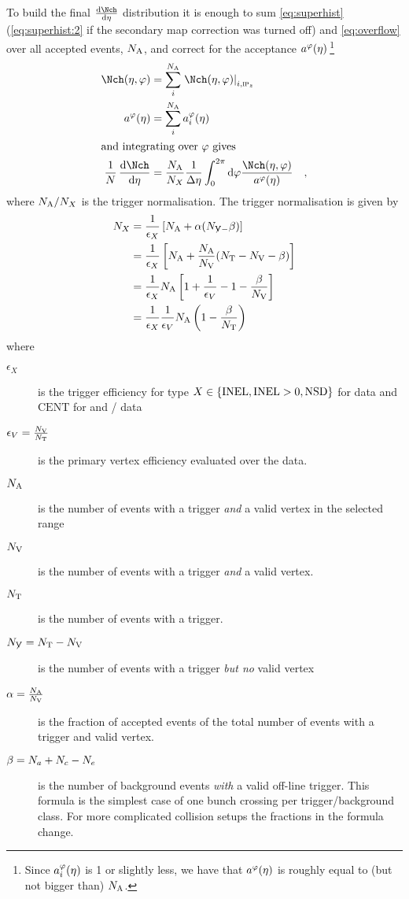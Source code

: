 To build the final $\dndeta$ distribution it is enough to sum
\eqref{eq:superhist} (\eqref{eq:superhist:2} if the secondary map
correction was turned off) and \eqref{eq:overflow} over all accepted
events, ${N_{\text{A}}}$, and correct for the acceptance
$a^{\varphi}(\eta){}\,$\footnote{Since $a_i^{\varphi}(\eta)$ is 1 or slightly less, we have
  that $a^{\varphi}(\eta)$ is roughly equal to (but not bigger than) ${N_{\text{A}}}$.}
\begin{align}
  \dndetadphi &= \sum_i^{\NA}\dndetadphi[i,\subIPz]\\ 
  \PhiAcc &= \sum_i^{\NA}\phiAcc\\
\intertext{and integrating over $\varphi$ gives}
  \ndndeta &=
  \frac{\NA}{\N{X}{}} \frac1{\Delta\eta} \int_0^{2\pi} \text{d}\varphi
  \frac{\dndetadphi}{\PhiAcc}\quad,\label{eq:eventnormdndeta}
\end{align}
where ${N_{\text{A}}}/{N_{X}}$ is the trigger normalisation.  The trigger
normalisation is given by 
\begin{align}
  {\ensuremath N_{X}} &= \frac{1}{\epsilon_X}\left[{N_{\text{A}}} +
    \alpha({N_{\not{\text{V}}-}}
    \beta)\right]  \label{eq:fulleventnorm}\\
  & = \frac{1}{\epsilon_X}\left[{N_{\text{A}}} + \frac{{N_{\text{A}}}}{{N_{\text{V}}}}({N_{\text{T}}}-{N_{\text{V}}}{} -
    \beta)\right]\nonumber \\
  & =\frac{1}{\epsilon_X}{N_{\text{A}}}\left[1+\frac{1}{\epsilon_V}-1-
    \frac{\beta}{{N_{\text{V}}}}\right]\nonumber\\
  & = \frac{1}{\epsilon_X}\frac{1}{\epsilon_V}{N_{\text{A}}}
  \left(1-\frac{\beta}{{N_{\text{T}}}{}}\right)\nonumber
\end{align}
where
\begin{description}
\item[$\epsilon_X$]  is the trigger efficiency for type
  $X\in\{\INEL,\INELONE,\NSD\}$ for \ppCol{} data and $\text{CENT}$
  for \PbPbCol{} and \pPbCol{}/\PbpCol{} data
\item[$\epsilon_V=\frac{{N_{\text{V}}}{}}{{N_{\text{T}}}{}}$] is the primary vertex
  efficiency evaluated over the data.
\item[${N_{\text{A}}}$] is the number of events with a trigger \emph{and} a valid
  vertex in the selected range
\item[${N_{\text{V}}}{}$] is the number of events with a trigger \emph{and} a valid
  vertex. 
\item[${N_{\text{T}}}$] is the number of events with a trigger.
\item[${N_{\not{\text{V}}}}={N_{\text{T}}}-{N_{\text{V}}}{}$] is the number of events with a trigger
  \emph{but no} valid vertex
\item[$\alpha=\frac{{N_{\text{A}}}}{{N_{\text{V}}}}$] is the fraction of accepted events of
  the total number of events with a trigger and valid vertex.  
\item[$\beta={N_{a}}+{N_{c}}-{N_{e}}$] is the number of background
  events \emph{with} a valid off-line trigger. This formula is the
  simplest case of one bunch crossing per trigger/background
  class. For more complicated collision setups the fractions in the
  formula change.
\end{description}
